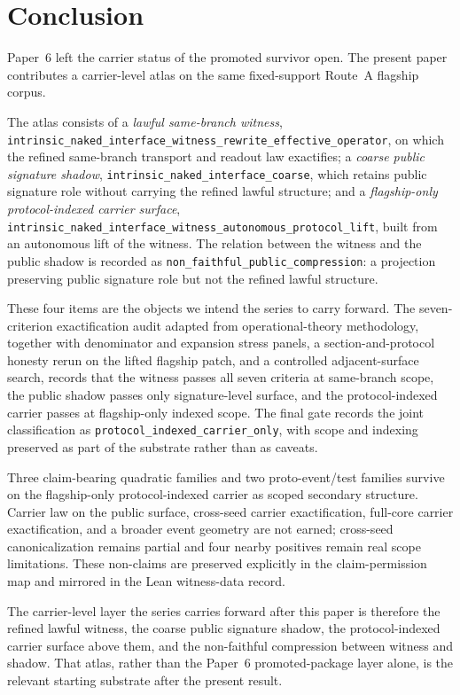 \documentclass[11pt]{article}
\theoremstyle{definition}
\begin{document}
 \section{Conclusion}
\label{sec:conclusion}

Paper~6 left the carrier status of the promoted survivor open. The present paper
contributes a carrier-level atlas on the same fixed-support Route~A flagship corpus.

The atlas consists of a \emph{lawful same-branch witness},
\nolinkurl{intrinsic_naked_interface_witness_rewrite_effective_operator}, on which
the refined same-branch transport and readout law exactifies; a \emph{coarse public
signature shadow}, \nolinkurl{intrinsic_naked_interface_coarse}, which retains
public signature role without carrying the refined lawful structure; and a
\emph{flagship-only protocol-indexed carrier surface},
\nolinkurl{intrinsic_naked_interface_witness_autonomous_protocol_lift}, built from
an autonomous lift of the witness. The relation between the witness and the public
shadow is recorded as \nolinkurl{non_faithful_public_compression}: a projection
preserving public signature role but not the refined lawful structure.

These four items are the objects we intend the series to carry forward. The
seven-criterion exactification audit adapted from operational-theory methodology,
together with denominator and expansion stress panels, a section-and-protocol
honesty rerun on the lifted flagship patch, and a controlled adjacent-surface
search, records that the witness passes all seven criteria at same-branch scope,
the public shadow passes only signature-level surface, and the protocol-indexed
carrier passes at flagship-only indexed scope. The final gate records the joint
classification as \texttt{protocol\_indexed\_carrier\_only}, with scope and
indexing preserved as part of the substrate rather than as caveats.

Three claim-bearing quadratic families and two proto-event/test families survive on
the flagship-only protocol-indexed carrier as scoped secondary structure. Carrier
law on the public surface, cross-seed carrier exactification, full-core carrier
exactification, and a broader event geometry are not earned; cross-seed
canonicalization remains partial and four nearby positives remain real scope
limitations. These non-claims are preserved explicitly in the claim-permission map
and mirrored in the Lean witness-data record.

The carrier-level layer the series carries forward after this paper is therefore
the refined lawful witness, the coarse public signature shadow, the protocol-indexed
carrier surface above them, and the non-faithful compression between witness and
shadow. That atlas, rather than the Paper~6 promoted-package layer alone, is the
relevant starting substrate after the present result.
 
\end{document}
